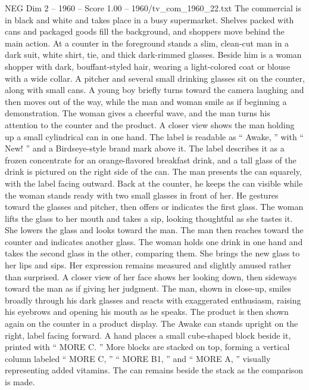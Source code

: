 \begin{textsample}{NEG Dim 2 – 1960 – Score 1.00 – 1960/tv\_com\_1960\_22.txt}  \label{ex:f2_neg_089}
The commercial is in black and white and takes place in a busy supermarket.
Shelves packed with cans and packaged goods fill the background, and shoppers move behind the main action.
At a counter in the foreground stands a slim, clean-cut man in a dark suit, white shirt, tie, and thick dark-rimmed glasses.
Beside him is a woman shopper with dark, bouffant-styled hair, wearing a light-colored coat or blouse with a wide collar.
A pitcher and several small drinking glasses sit on the counter, along with small cans.
A young boy briefly turns toward the camera laughing and then moves out of the way, while the man and woman smile as if beginning a demonstration.
The woman gives a cheerful wave, and the man turns his attention to the counter and the product.
A closer view shows the man holding up a small cylindrical can in one hand.
The label is readable as “ Awake, ” with “ New! ” and a Birdseye-style brand mark above it.
The label describes it as a frozen concentrate for an orange-flavored breakfast drink, and a tall glass of the drink is pictured on the right side of the can.
The man presents the can squarely, with the label facing outward.
Back at the counter, he keeps the can visible while the woman stands ready with two small glasses in front of her.
He gestures toward the glasses and pitcher, then offers or indicates the first glass.
The woman lifts the glass to her mouth and takes a sip, looking thoughtful as she tastes it.
She lowers the glass and looks toward the man.
The man then reaches toward the counter and indicates another glass.
The woman holds one drink in one hand and takes the second glass in the other, comparing them.
She brings the new glass to her lips and sips.
Her expression remains measured and slightly amused rather than surprised.
A closer view of her face shows her looking down, then sideways toward the man as if giving her judgment.
The man, shown in close-up, smiles broadly through his dark glasses and reacts with exaggerated enthusiasm, raising his eyebrows and opening his mouth as he speaks.
The product is then shown again on the counter in a product display.
The Awake can stands upright on the right, label facing forward.
A hand places a small cube-shaped block beside it, printed with “ MORE C. ” More blocks are stacked on top, forming a vertical column labeled “ MORE C, ” “ MORE B1, ” and “ MORE A, ” visually representing added vitamins.
The can remains beside the stack as the comparison is made.

\end{textsample}
